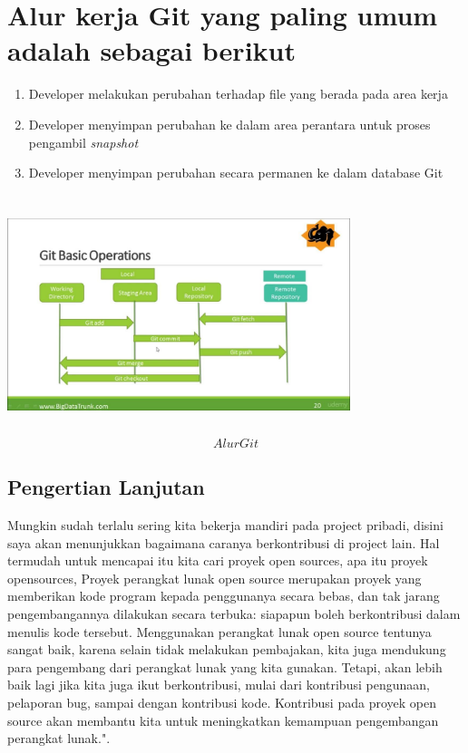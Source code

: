 \section{Alur kerja Git yang paling umum adalah sebagai berikut} \par


\begin{enumerate}


\item Developer melakukan perubahan terhadap file yang berada pada area kerja \par
\item Developer menyimpan perubahan ke dalam area perantara untuk proses pengambil \textit{snapshot} \par
\item Developer menyimpan perubahan secara permanen ke dalam database Git \par
\vspace{12pt}
\vspace{12pt}
\noindent 
\end {enumerate}


\includegraphics[width=10cm,height=7cm]{Figures/dapgit4.jpg}
\begin{equation}Alur Git \end{equation}

\subsection{Pengertian Lanjutan}

Mungkin sudah terlalu sering kita bekerja mandiri pada project pribadi, disini saya akan menunjukkan bagaimana caranya berkontribusi di project lain. Hal termudah untuk mencapai itu kita cari proyek open sources, apa itu proyek opensources, Proyek perangkat lunak open source merupakan proyek yang memberikan kode program kepada penggunanya secara bebas, dan tak jarang pengembangannya dilakukan secara terbuka: siapapun boleh berkontribusi dalam menulis kode tersebut. Menggunakan perangkat lunak open source tentunya sangat baik, karena selain tidak melakukan pembajakan, kita juga mendukung para pengembang dari perangkat lunak yang kita gunakan. Tetapi, akan lebih baik lagi jika kita juga ikut berkontribusi, mulai dari kontribusi pengunaan, pelaporan bug, sampai dengan kontribusi kode. Kontribusi pada proyek open source akan membantu kita untuk meningkatkan kemampuan pengembangan perangkat lunak.". \par
\vspace{12pt}
\vspace{12pt}
\noindent 
